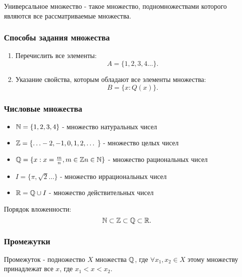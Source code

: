 \begin{definition}
  Универсальное множество - такое множество, подномножествами которого являются все рассматриваемые множества.
\end{definition}

\subsubsection{Способы задания множества}

\begin{enumerate}
  \item Перечислить все элементы:
   \[
  A = \{1, 2, 3, 4 \ldots\} 
  .\] 
  \item Указание свойства, которым обладают все элементы множества:
  \[
  B = \{x : Q(x)\} 
  .\] 
\end{enumerate}

\subsubsection{Числовые множества}
\begin{itemize}
  \item $\mathbb{N} = \{1, 2, 3, 4\} $ - множество натуральных чисел\\
  \item $\mathbb{Z} = \{ \ldots -2, -1, 0, 1, 2, \ldots$ \} - множество целых чисел\\
  \item $\mathbb{Q} = \{x : x = \frac{m}{n}, m\in \mathbb{Z} n\in \mathbb{N}\} $ - множество рациональных чисел\\
  \item $I = \{\pi, \sqrt{2}\ldots \} $ - множество иррациональных чисел\\
  \item $\mathbb{R} = \mathbb{Q} \cup I $ - множество действительных чисел
\end{itemize}
\begin{note}
  Порядок вложенности:
  \[
  \mathbb{N} \subset \mathbb{Z} \subset \mathbb{Q} \subset \mathbb{R}
  .\] 
\end{note}

\subsubsection*{Промежутки}
\begin{definition}
  Промежуток - подножество $X$ множества $\mathbb{Q}$, где $\forall x_1, x_2\in X$ этому множеству принадлежат все $x$, где $x_1 < x < x_2$.
\end{definition}


